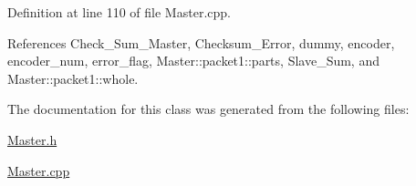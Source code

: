Definition at line 110 of file Master.\-cpp.



References Check\-\_\-\-Sum\-\_\-\-Master, Checksum\-\_\-\-Error, dummy, encoder, encoder\-\_\-num, error\-\_\-flag, Master\-::packet1\-::parts, Slave\-\_\-\-Sum, and Master\-::packet1\-::whole.



The documentation for this class was generated from the following files\-:\begin{DoxyCompactItemize}
\item 
\hyperlink{Master_8h}{Master.\-h}\item 
\hyperlink{Master_8cpp}{Master.\-cpp}\end{DoxyCompactItemize}
